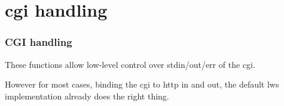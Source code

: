 \hypertarget{group__cgi}{}\section{cgi handling}
\label{group__cgi}
\subsubsection*{C\+GI handling}

These functions allow low-\/level control over stdin/out/err of the cgi.

However for most cases, binding the cgi to http in and out, the default lws implementation already does the right thing. 
